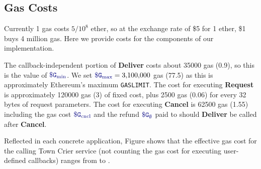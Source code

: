 \subsection{Gas Costs}
Currently 1 gas costs $5 / 10^8$ ether, so at the exchange rate of \$5 for 1 ether, \$1 buys 4 million gas.
Here we provide costs for the components of our implementation.

The callback-independent portion of {\bf Deliver} costs about \num[group-separator={,}]{35000} gas (0.9\textcent), so this is the value of $\constgasmin$.
We set $\constgasmax = \num[group-separator={,}]{3100000}$ gas (77.5\textcent) as this is approximately Ethereum's maximum {\tt GASLIMIT}.
The cost for executing {\bf Request} is approximately \num[group-separator={,}]{120000} gas (3\textcent) of fixed cost, 
plus \num[group-separator={,}]{2500} gas (0.06\textcent) for every 32 bytes of request parameters.
The cost for executing {\bf Cancel} is 62500 gas (1.55\textcent)
including the gas cost $\constgasinvokecancel$ and the refund $\constgascancel$ paid to \tcs should {\bf Deliver} be called after {\bf Cancel}.

Reflected in each concrete application, Figure 
shows that the effective gas cost  
for the calling Town Crier service (not counting the gas cost for executing
user-defined callbacks)
ranges from  to .



